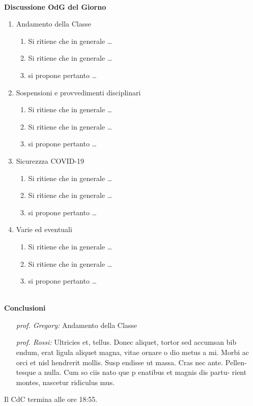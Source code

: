 \documentclass[11pt]{article}
\begin{document}
\vspace{12pt}
\par\noindent\dotfill{}\\[10pt]
{\bf Discussione OdG del Giorno}
\begin{enumerate}
	\item Andamento della Classe
	
	\begin{enumerate}
		\item Si ritiene che in generale \dots
		\item Si ritiene che in generale \dots
		\item si propone pertanto \dots
	\end{enumerate}
	
	\item Sospensioni e provvedimenti disciplinari
		\begin{enumerate}
		\item Si ritiene che in generale \dots
		\item Si ritiene che in generale \dots
		\item si propone pertanto \dots
	\end{enumerate}
	
	\item Sicurezzza COVID-19
		\begin{enumerate}
		\item Si ritiene che in generale \dots
		\item Si ritiene che in generale \dots
		\item si propone pertanto \dots
	\end{enumerate}
	
	\item Varie ed eventuali
		\begin{enumerate}
		\item Si ritiene che in generale \dots
		\item Si ritiene che in generale \dots
		\item si propone pertanto \dots
	\end{enumerate}
	
\end{enumerate}


\vspace{12pt}
\par\noindent\dotfill{}\\[12pt]
{\bf Conclusioni}
\begin{enumerate}[label=\roman*]
	\item [\em prof. Gregory:]Andamento della Classe
	\item [\em prof. Rossi:]Ultricies et, tellus. Donec aliquet, tortor sed accumsan bib endum, erat ligula aliquet magna, vitae ornare o dio metus a mi. Morbi ac orci et nisl hendrerit mollis. Susp endisse ut massa. Cras nec ante. Pellen- tesque a nulla. Cum so ciis nato que p enatibus et magnis dis partu- rient montes, nascetur ridiculus mus.
\end{enumerate}
Il CdC termina alle ore 18:55.
\end{document}
